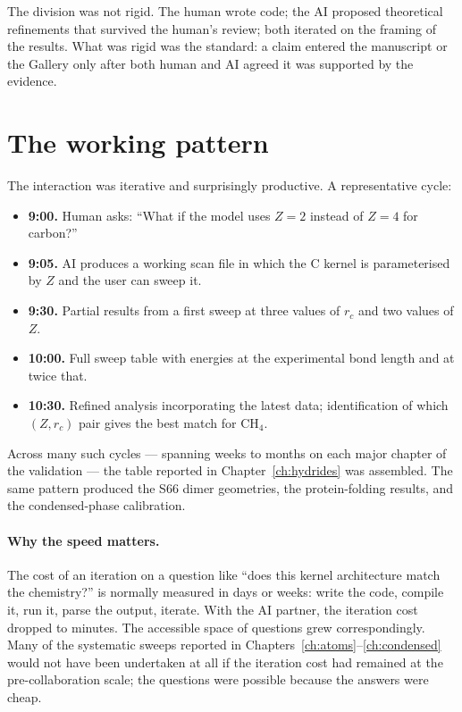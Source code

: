 The division was not rigid. The human wrote code; the AI proposed theoretical refinements that survived the human's review; both iterated on the framing of the results. What was rigid was the standard: a claim entered the manuscript or the Gallery only after both human and AI agreed it was supported by the evidence.

\section{The working pattern}\label{sec:working-pattern}

The interaction was iterative and surprisingly productive. A representative cycle:

\begin{itemize}
\item \textbf{9:00.} Human asks: ``What if the model uses $Z = 2$ instead of $Z = 4$ for carbon?''
\item \textbf{9:05.} AI produces a working scan file in which the C kernel is parameterised by $Z$ and the user can sweep it.
\item \textbf{9:30.} Partial results from a first sweep at three values of $r_c$ and two values of $Z$.
\item \textbf{10:00.} Full sweep table with energies at the experimental bond length and at twice that.
\item \textbf{10:30.} Refined analysis incorporating the latest data; identification of which $(Z, r_c)$ pair gives the best match for CH$_4$.
\end{itemize}
Across many such cycles --- spanning weeks to months on each major chapter of the validation --- the table reported in Chapter~\ref{ch:hydrides} was assembled. The same pattern produced the S66 dimer geometries, the protein-folding results, and the condensed-phase calibration.

\paragraph{Why the speed matters.}
The cost of an iteration on a question like ``does this kernel architecture match the chemistry?'' is normally measured in days or weeks: write the code, compile it, run it, parse the output, iterate. With the AI partner, the iteration cost dropped to minutes. The accessible space of questions grew correspondingly. Many of the systematic sweeps reported in Chapters~\ref{ch:atoms}--\ref{ch:condensed} would not have been undertaken at all if the iteration cost had remained at the pre-collaboration scale; the questions were possible because the answers were cheap.

